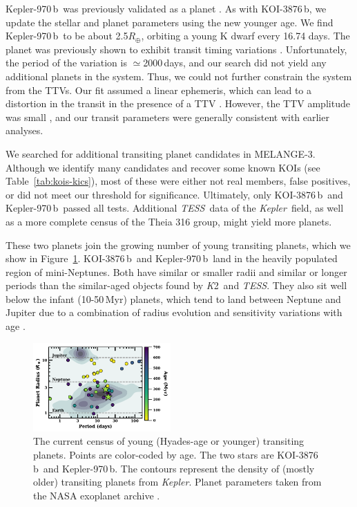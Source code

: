 \documentclass[twocolumn, linenumbers]{aastex631}
\newcommand{\association}{MELANGE-3}
\newcommand{\planetname}{KOI-3876\,b}
\newcommand{\planetnametwo}{Kepler-970\,b}
\newcommand{\kepler}{{\it Kepler}}
\newcommand{\tess}{\textit{TESS}}
\newcommand{\ktwo}{{\textit K2}}
\begin{document}
\planetnametwo\ was previously validated as a planet \citep{2016ApJ...822...86M}. As with \planetname, we update the stellar and planet parameters using the new younger age. We find \planetnametwo\ to be about 2.5$R_\oplus$, orbiting a young K dwarf every 16.74 days. The planet was previously shown to exhibit transit timing variations \citep[TTVs; e.g.,][]{2012ApJ...756..185F, 2016ApJS..225....9H}. Unfortunately, the period of the variation is $\simeq$2000\,days, and our search did not yield any additional planets in the system. Thus, we could not further constrain the system from the TTVs. Our fit assumed a linear ephemeris, which can lead to a distortion in the transit in the presence of a TTV \citep[a shallower depth and longer duration, e.g.,][]{Mann2017b}. However, the TTV amplitude was small \citep[$\lesssim10$\,m;][]{2016ApJS..225....9H}, and our transit parameters were generally consistent with earlier analyses. 

We searched for additional transiting planet candidates in \association. Although we identify many candidates and recover some known KOIs (see Table~\ref{tab:kois-kics}), most of these were either not real members, false positives, or did not meet our threshold for significance. Ultimately, only \planetname\ and \planetnametwo\ passed all tests. Additional \tess\ data of the \kepler\ field, as well as a more complete census of the Theia 316 group, might yield more planets.

These two planets join the growing number of young transiting planets, which we show in Figure~\ref{fig:census}. \planetname\ and \planetnametwo\ land in the heavily populated region of mini-Neptunes. Both have similar or smaller radii and similar or longer periods than the similar-aged objects found by \ktwo\ and \tess. They also sit well below the infant (10-50\,Myr) planets, which tend to land between Neptune and Jupiter due to a combination of radius evolution \citep{Mann2017a, 2020MNRAS.498.5030O} and sensitivity variations with age \citep{Rizzuto2017}.

\begin{figure}[tb]
    \centering
    \includegraphics[width=0.47\textwidth]{Radius_v_Period_v2.pdf}
    \caption{The current census of young (Hyades-age or younger) transiting planets. Points are color-coded by age. The two stars are \planetname\ and \planetnametwo. The contours represent the density of (mostly older) transiting planets from \kepler. Planet parameters taken from the NASA exoplanet archive \citep{NASAexplanetarchive}. }
    \label{fig:census}
\end{figure}
\end{document}
